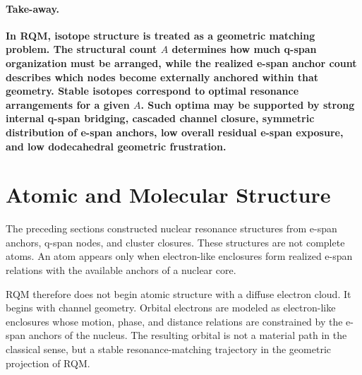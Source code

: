 \documentclass[11pt,a4paper]{article}
\begin{document}
\paragraph{Take-away.}
\textbf{In RQM, isotope structure is treated as a geometric matching problem. The structural count \(A\) determines how much q-span organization must be arranged, while the realized e-span anchor count describes which nodes become externally anchored within that geometry. Stable isotopes correspond to optimal resonance arrangements for a given \(A\). Such optima may be supported by strong internal q-span bridging, cascaded channel closure, symmetric distribution of e-span anchors, low overall residual e-span exposure, and low dodecahedral geometric frustration.}





\section{Atomic and Molecular Structure}

The preceding sections constructed nuclear resonance structures from e-span anchors, q-span nodes, and cluster closures. These structures are not complete atoms. An atom appears only when electron-like enclosures form realized e-span relations with the available anchors of a nuclear core.

RQM therefore does not begin atomic structure with a diffuse electron cloud. It begins with channel geometry. Orbital electrons are modeled as electron-like enclosures whose motion, phase, and distance relations are constrained by the e-span anchors of the nucleus. The resulting orbital is not a material path in the classical sense, but a stable resonance-matching trajectory in the geometric projection of RQM.
\end{document}
